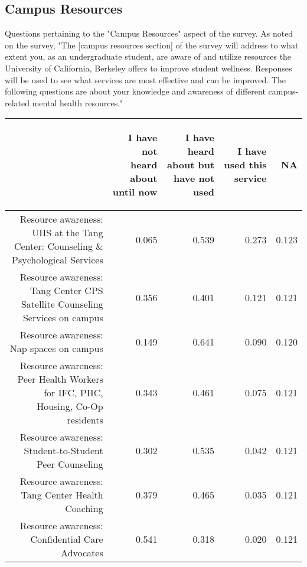 \documentclass{article}\usepackage[]{graphicx}\usepackage[]{color}
\begin{document}
\newpage

\subsection{Campus Resources}
Questions pertaining to the "Campus Resources" aspect of the survey. As noted on the survey, "The [campus resources section] of the survey will address to what extent you, as an
undergraduate student, are aware of and utilize resources the University of
California, Berkeley offers to improve student wellness.  Responses will be used
to see what services are most effective and can be improved.  The following
questions are about your knowledge and awareness of different campus-related
mental health resources." 
\begin{table}[ht]
\centering
\begin{tabular}{rrrrr}
  \hline
 & \begin{sideways} I have not heard about until now \end{sideways} & \begin{sideways} I have heard about but have not used \end{sideways} & \begin{sideways} I have used this service \end{sideways} & \begin{sideways} NA \end{sideways} \\ 
  \hline
Resource awareness: UHS at the Tang Center: Counseling \& Psychological Services & 0.065 & 0.539 & 0.273 & 0.123 \\ 
  Resource awareness: Tang Center CPS Satellite Counseling Services on campus & 0.356 & 0.401 & 0.121 & 0.121 \\ 
  Resource awareness: Nap spaces on campus & 0.149 & 0.641 & 0.090 & 0.120 \\ 
  Resource awareness: Peer Health Workers for IFC, PHC, Housing, Co-Op residents & 0.343 & 0.461 & 0.075 & 0.121 \\ 
  Resource awareness: Student-to-Student Peer Counseling & 0.302 & 0.535 & 0.042 & 0.121 \\ 
  Resource awareness: Tang Center Health Coaching & 0.379 & 0.465 & 0.035 & 0.121 \\ 
  Resource awareness: Confidential Care Advocates & 0.541 & 0.318 & 0.020 & 0.121 \\ 
   \hline
\end{tabular}
\end{table}
\end{document}

